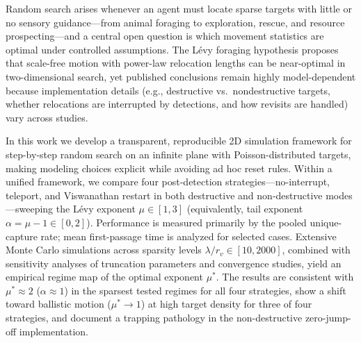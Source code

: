 
Random search arises whenever an agent must locate sparse targets with little or no sensory guidance---from animal foraging to exploration, rescue, and resource prospecting---and a central open question is which movement statistics are optimal under controlled assumptions. The L\'evy foraging hypothesis proposes that scale-free motion with power-law relocation lengths can be near-optimal in two-dimensional search, yet published conclusions remain highly model-dependent because implementation details (e.g., destructive vs.\ nondestructive targets, whether relocations are interrupted by detections, and how revisits are handled) vary across studies.

In this work we develop a transparent, reproducible 2D simulation framework for step-by-step random search on an infinite plane with Poisson-distributed targets, making modeling choices explicit while avoiding ad hoc reset rules. Within a unified framework, we compare four post-detection strategies---no-interrupt, teleport, and Viswanathan restart in both destructive and non-destructive modes---sweeping the L\'evy exponent $\mu \in [1, 3]$ (equivalently, tail exponent $\alpha = \mu - 1 \in [0, 2]$). Performance is measured primarily by the pooled unique-capture rate; mean first-passage time is analyzed for selected cases. Extensive Monte Carlo simulations across sparsity levels $\lambda/r_v \in [10, 2000]$, combined with sensitivity analyses of truncation parameters and convergence studies, yield an empirical regime map of the optimal exponent $\mu^*$. The results are consistent with $\mu^* \approx 2$ ($\alpha \approx 1$) in the sparsest tested regimes for all four strategies, show a shift toward ballistic motion ($\mu^* \to 1$) at high target density for three of four strategies, and document a trapping pathology in the non-destructive zero-jump-off implementation.
